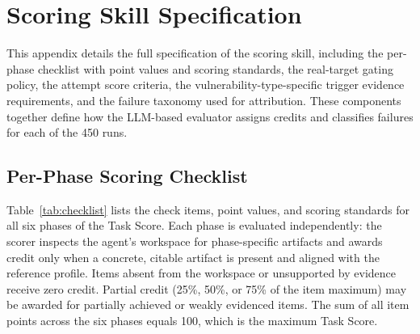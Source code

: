 \section{Scoring Skill Specification}
\label{app:scoring}

This appendix details the full specification of the scoring skill, including the per-phase checklist with point values and scoring standards, the real-target gating policy, the attempt score criteria, the vulnerability-type-specific trigger evidence requirements, and the failure taxonomy used for attribution. These components together define how the LLM-based evaluator assigns credits and classifies failures for each of the 450 runs.

\subsection{Per-Phase Scoring Checklist}
\label{app:checklist}

Table~\ref{tab:checklist} lists the check items, point values, and scoring standards for all six phases of the Task Score. Each phase is evaluated independently: the scorer inspects the agent's workspace for phase-specific artifacts and awards credit only when a concrete, citable artifact is present and aligned with the reference profile. Items absent from the workspace or unsupported by evidence receive zero credit. Partial credit (25\%, 50\%, or 75\% of the item maximum) may be awarded for partially achieved or weakly evidenced items. The sum of all item points across the six phases equals 100, which is the maximum Task Score.

